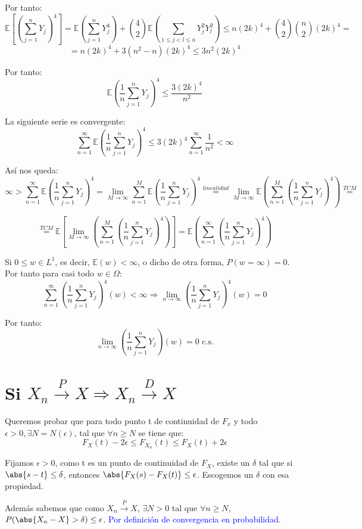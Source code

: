 \documentclass{apuntes}
\begin{document}
Por tanto:
\[
\mathbb{E}\left[(\sum_{j=1}^{n} Y_j)^4\right]= \mathbb{E}(\sum_{j=1}^{n} Y_j^4) + \binom{4}{2}\mathbb{E}(\sum_{1\leq j<l\leq n} Y_j^2 Y_l^2)\leq n(2k)^4 + \binom{4}{2}\binom{n}{2}(2k)^4 =
\]
\[
= n(2k)^4+3(n^2-n)(2k)^4 \leq 3n^2(2k)^4
\]

Por tanto:
\[
\mathbb{E}(\frac{1}{n}\sum_{j=1}^{n}Y_j)^4 \leq \frac{3(2k)^4}{n^2}
\]

La siguiente serie es convergente: 
\[
\sum_{n=1}^{\infty}\mathbb{E}(\frac{1}{n}\sum_{j=1}^{n}Y_j)^4 \leq 3(2k)^4 \sum_{n=1}^{\infty}\frac{1}{n^2} < \infty
\]

Así nos queda:
\[
\infty > \sum_{n=1}^{\infty}\mathbb{E}(\frac{1}{n}\sum_{j=1}^{n}Y_j)^4 = \lim_{M \rightarrow \infty}\sum_{n=1}^{M}\mathbb{E}(\frac{1}{n}\sum_{j=1}^{n}Y_j)^4 \stackrel{linealidad}{=} \lim_{M \rightarrow \infty} \mathbb{E}\left(\sum_{n=1}^{M}(\frac{1}{n}\sum_{j=1}^{n}Y_j)^4 \right) \stackrel{TCM}{=}
\]

\[
\stackrel{TCM}{=} \mathbb{E}\left[\lim_{M \rightarrow \infty}\left(\sum_{n=1}^{M}(\frac{1}{n}\sum_{j=1}^{n} Y_j)^4 \right)  \right] = \mathbb{E}\left(\sum_{n=1}^{\infty}(\frac{1}{n}\sum_{j=1}^{n} Y_j)^4 \right)
\]

Si $0 \leq w \in L^1$, es decir, $\mathbb{E}(w) < \infty$, o dicho de otra forma, $P(w = \infty)=0$. Por tanto para casi todo $w \in \Omega$:
\[
\sum_{n=1}^{\infty}(\frac{1}{n}\sum_{j=1}^{n}Y_j)^4 (w) < \infty  \Rightarrow \lim_{n \rightarrow \infty}(\frac{1}{n}\sum_{j=1}^{n}Y_j)^4 (w) = 0
\]

Por tanto:
\[
\lim_{n \rightarrow \infty}(\frac{1}{n}\sum_{j=1}^{n}Y_j) (w) = 0 \text{ c.s.}
\]

\section{Si $X_n \stackrel{P}{\rightarrow} X  \Rightarrow X_n \stackrel{D}{\rightarrow} X$}
Queremos probar que para todo punto t de continuidad de $F_x$ y todo $\epsilon >0, \exists N=N(\epsilon)$, tal que $\forall n \geq N$ se tiene que:
\[
F_X(t)-2\epsilon \leq F_{X_n}(t) \leq F_X(t)+2\epsilon
\]

Fijamos $\epsilon>0$, como t es un punto de continuidad de $F_X$, existe un $\delta$ tal que si $\abs{s-t}\leq \delta$, entonces $\abs{F_X(s)-F_X(t)} \leq \epsilon$. Escogemos un $\delta$ con esa propiedad.

Además sabemos que como $X_n \stackrel{P}{\rightarrow} X$, $\exists N>0$ tal que $\forall n \geq N$, $P(\abs{X_n -X}>\delta)\leq \epsilon$. \textcolor{blue}{Por definición de convergencia en probabilidad}.
\end{document}
